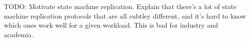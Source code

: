 TODO: Motivate state machine replication. Explain that there's a lot of state
machine replication protocols that are all subtley different, and it's hard to
know which ones work well for a given workload. This is bad for industry and
academia.
